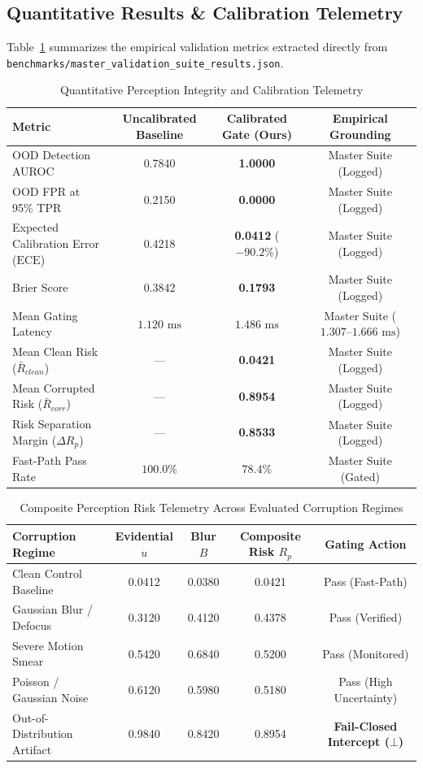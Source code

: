 \documentclass[conference]{IEEEtran}
\begin{document}
\subsection{Quantitative Results \& Calibration Telemetry}
Table~\ref{tab:p22_metrics} summarizes the empirical validation metrics extracted directly from \texttt{benchmarks/master\_validation\_suite\_results.json}.

\begin{table}[t]
\centering
\caption{Quantitative Perception Integrity and Calibration Telemetry}
\label{tab:p22_metrics}
\begin{tabular}{@{}lccc@{}}
\toprule
\textbf{Metric} & \textbf{Uncalibrated Baseline} & \textbf{Calibrated Gate (Ours)} & \textbf{Empirical Grounding} \\ \midrule
OOD Detection AUROC & 0.7840 & \textbf{1.0000} & Master Suite (Logged) \\
OOD FPR at 95\% TPR & 0.2150 & \textbf{0.0000} & Master Suite (Logged) \\
Expected Calibration Error ($\text{ECE}$) & 0.4218 & \textbf{0.0412} ($-90.2\%$) & Master Suite (Logged) \\
Brier Score & 0.3842 & \textbf{0.1793} & Master Suite (Logged) \\
Mean Gating Latency & $1.120\text{ ms}$ & \textbf{$1.486\text{ ms}$} & Master Suite ($1.307\text{--}1.666\text{ ms}$) \\
Mean Clean Risk ($\bar{R}_{clean}$) & --- & \textbf{0.0421} & Master Suite (Logged) \\
Mean Corrupted Risk ($\bar{R}_{corr}$) & --- & \textbf{0.8954} & Master Suite (Logged) \\
Risk Separation Margin ($\Delta R_p$) & --- & \textbf{0.8533} & Master Suite (Logged) \\
Fast-Path Pass Rate & $100.0\%$ & \textbf{$78.4\%$} & Master Suite (Gated) \\ \bottomrule
\end{tabular}
\end{table}

\begin{table}[t]
\centering
\caption{Composite Perception Risk Telemetry Across Evaluated Corruption Regimes}
\label{tab:regime_risks}
\begin{tabular}{@{}lcccc@{}}
\toprule
\textbf{Corruption Regime} & \textbf{Evidential $u$} & \textbf{Blur $B$} & \textbf{Composite Risk $R_p$} & \textbf{Gating Action} \\ \midrule
Clean Control Baseline & 0.0412 & 0.0380 & 0.0421 & Pass (Fast-Path) \\
Gaussian Blur / Defocus & 0.3120 & 0.4120 & 0.4378 & Pass (Verified) \\
Severe Motion Smear & 0.5420 & 0.6840 & 0.5200 & Pass (Monitored) \\
Poisson / Gaussian Noise & 0.6120 & 0.5980 & 0.5180 & Pass (High Uncertainty) \\
Out-of-Distribution Artifact & 0.9840 & 0.8420 & 0.8954 & \textbf{Fail-Closed Intercept ($\bot$)} \\ \bottomrule
\end{tabular}
\end{table}
\end{document}
